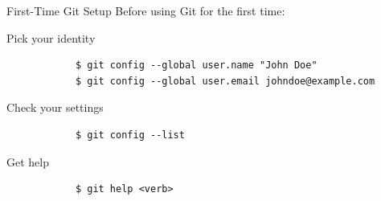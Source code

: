 \documentclass{beamer}
\begin{document}
\begin{frame}[fragile]{First-Time Git Setup}
Before using Git for the first time:
	\begin{exampleblock}{Pick your identity}
		\begin{verbatim}
			$ git config --global user.name "John Doe"
			$ git config --global user.email johndoe@example.com
		\end{verbatim}
	\end{exampleblock}
	
	\begin{exampleblock}{Check your settings}
		\begin{verbatim}
			$ git config --list
		\end{verbatim}
	\end{exampleblock}
	
	\begin{exampleblock}{Get help}
		\begin{verbatim}
			$ git help <verb>
		\end{verbatim}
	\end{exampleblock}
\end{frame}
\end{document}
